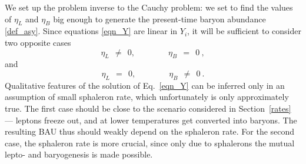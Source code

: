 \documentclass[12pt]{revtex4}
\begin{document}
	We set up the problem inverse to the Cauchy problem:
	we set to find the values of $ \eta_L $ and $ \eta_B $ 
	big enough to generate the present-time baryon 
	abundance \eqref{def_asy}.
	Since equations \eqref{eqn_Y} are linear in $ Y_i $,
	it will be sufficient to consider two opposite cases
\[
	\eta_L ~~\neq~~ 0,\qquad\qquad \eta_B ~~=~~ 0~, 
\]
	and
\[
	\eta_L ~~=~~ 0,\qquad\qquad \eta_B ~~\neq~~ 0~.
\]
	Qualitative features of the solution of Eq.~\eqref{eqn_Y} can
	be inferred only in an assumption of small sphaleron rate,
	which unfortunately is only approximately true.
	The first case should be close to the scenario considered in
	Section~\ref{rates}  --- 
	leptons freeze out, and at lower temperatures get converted
	into baryons. 
	The resulting BAU thus should weakly depend on the sphaleron
	rate.
	For the second case, the sphaleron rate is more crucial, since
	only due to sphalerons the mutual lepto- and baryogenesis is
	made possible. 
	
\end{document}
